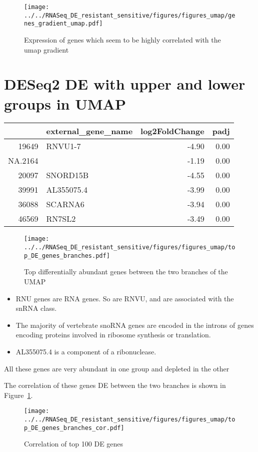 \documentclass{article}
\begin{document}
\begin{figure}[h]
\texttt{[image: ../../RNASeq\_DE\_resistant\_sensitive/figures/figures\_umap/genes\_gradient\_umap.pdf]}
\caption{Expression of genes which seem to be highly correlated with the umap gradient}
\end{figure}

\section{DESeq2 DE with upper and lower groups in UMAP}
\begin{table}[ht]
\centering
\begin{tabular}{rlrr}
  \hline
 & external\_gene\_name & log2FoldChange & padj \\ 
  \hline
19649 & RNVU1-7 & -4.90 & 0.00 \\ 
  NA.2164 &  & -1.19 & 0.00 \\ 
  20097 & SNORD15B & -4.55 & 0.00 \\ 
  39991 & AL355075.4 & -3.99 & 0.00 \\ 
  36088 & SCARNA6 & -3.94 & 0.00 \\ 
  46569 & RN7SL2 & -3.49 & 0.00 \\ 
   \hline
\end{tabular}
\end{table}

\begin{figure}[h]
\texttt{[image: ../../RNASeq\_DE\_resistant\_sensitive/figures/figures\_umap/top\_DE\_genes\_branches.pdf]}
\caption{Top differentially abundant genes between the two branches of the UMAP}
\end{figure}

\begin{itemize}
\item RNU genes are RNA genes. So are RNVU, and are associated with the snRNA class.
\item The majority of vertebrate snoRNA genes are encoded in the introns of genes encoding proteins involved in ribosome synthesis or translation.
\item AL355075.4 is a component of a ribonuclease.
\end{itemize}

All these genes are very abundant in one group and depleted in the other

The correlation of these genes DE between the two branches is shown in Figure~\ref{fig:cor_two_branches}.
\begin{figure}[h]
\texttt{[image: ../../RNASeq\_DE\_resistant\_sensitive/figures/figures\_umap/top\_DE\_genes\_branches\_cor.pdf]}
\caption{Correlation of top 100 DE genes\label{fig:cor_two_branches}}
\end{figure}
\end{document}
